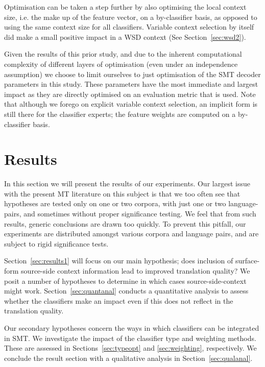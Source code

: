 Optimisation can be taken a step further by also optimising the local context
size, i.e. the make up of the feature vector, on a by-classifier basis, as
opposed to using the same context size for all classifiers.  Variable context selection by itself
did make a small positive impact in a WSD context (See Section~\ref{sec:wsd2}).

Given the results of this prior study, and due to the inherent computational
complexity of different layers of optimisation (even under an independence
assumption) we choose to limit ourselves to just optimisation of the SMT
decoder parameters in this study. These parameters have the most immediate and
largest impact as they are directly optimised on an evaluation metric that is
used.  Note that although we forego on explicit variable context selection, an
implicit form is still there for the classifier experts; the feature weights
are computed on a by-classifier basis.

\section{Results}
\label{sec:results}

In this section we will present the results of our experiments.  Our largest
issue with the present MT literature on this subject is that we too often see
that hypotheses are tested only on one or two corpora, with just one or two
language-pairs, and sometimes without proper significance testing. We feel that
from such results, generic conclusions are drawn too quickly. To prevent this
pitfall, our experiments are distributed amongst various corpora and language
pairs, and are subject to rigid significance tests.

Section~\ref{sec:results1} will focus on our main hypothesis; does inclusion of
surface-form source-side context information lead to improved translation
quality?  We posit a number of hypotheses to determine in which cases
source-side-context might work. Section~\ref{sec:quantanal} conducts a
quantitative analysis to assess whether the classifiers make an impact even if
this does not reflect in the translation quality.

Our secondary hypotheses concern the ways in which classifiers can be
integrated in SMT. We investigate the impact of the classifier type and
weighting methods.  These are assessed in Sections~\ref{sec:typeopt} and
\ref{sec:weighting}, respectively. We conclude the result section with a
qualitative analysis in Section~\ref{sec:qualanal}.

